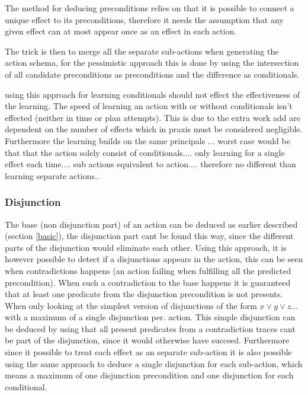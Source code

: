 	The method for deducing preconditions relies on that it is possible to connect a unique effect to its preconditions, therefore it needs the assumption that any given effect can at most appear once as an effect in each action.
	
	The trick is then to merge all the separate sub-actions when generating the action schema, for the pessimistic approach this is done by using the intersection of all candidate preconditions as preconditions and the difference as conditionals.
	
	
using this approach for learning conditionals should not effect the effectiveness of the learning.
	The speed of learning an action with or without conditionals isn't effected (neither in time or plan attempts). This is due to the extra work add are dependent on the number of effects which in praxis must be considered negligible. Furthermore the learning builds on the same principals ...  worst case would be that that the action solely consist of conditionals.... only learning for a single effect each time.... sub actions equivalent to action.... therefore no different than learning separate actions.. 
	

\subsubsection{Disjunction}
	The base (non disjunction part) of an action can be deduced as earlier described (section \ref{basic}), the disjunction part cant be found this way, since the different parts of the disjunction would eliminate each other. Using this approach, it is however possible to detect if a disjunctions appears in the action, this can be seen when contradictions happens (an action failing when fulfilling all the predicted precondition). When such a contradiction to the base happens it is guaranteed that at least one predicate from the disjunction precondition is not presents. When only looking at the simplest version of disjunctions of the form $ x \lor y \lor z...$ with a maximum of a single disjunction per. action. This simple disjunction can be deduced by using that all present predicates from a contradiction traces cant be part of the disjunction, since it would otherwise have succeed. Furthermore since it possible to treat each effect as an separate sub-action it is also possible using the same approach to deduce a single disjunction for each sub-action, which means a maximum of one disjunction precondition and one disjunction for each conditional. 
	

